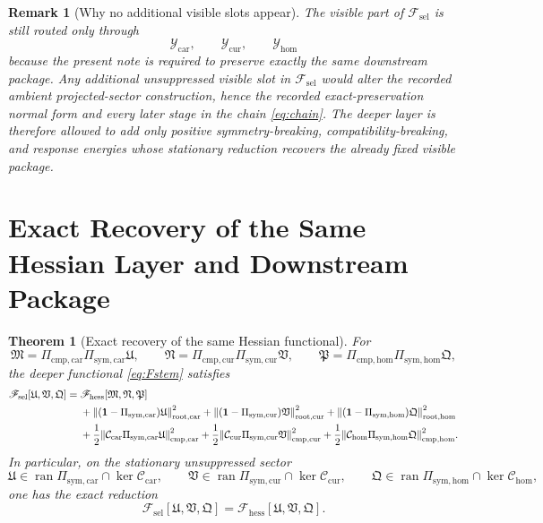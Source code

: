 \documentclass[11pt]{article}
\newcommand{\RootFunctional}{\mathscr F_{\mathrm{hess}}}
\newcommand{\StemFunctional}{\mathscr F_{\mathrm{sel}}}
\newcommand{\ProtoTensorClass}{\mathscr Y_{\mathrm{car}}}
\newcommand{\ProtoRelabelClass}{\mathscr Y_{\mathrm{cur}}}
\newcommand{\ProtoFreeClass}{\mathscr Y_{\mathrm{hom}}}
\newcommand{\UltraTensor}{\mathfrak M}
\newcommand{\UltraRelabel}{\mathfrak N}
\newcommand{\UltraFree}{\mathfrak P}
\newcommand{\RootTensor}{\mathfrak U}
\newcommand{\RootRelabel}{\mathfrak V}
\newcommand{\RootFree}{\mathfrak Q}
\newcommand{\TensorSymProj}{\Pi_{\mathrm{sym,car}}}
\newcommand{\CurSymProj}{\Pi_{\mathrm{sym,cur}}}
\newcommand{\HomSymProj}{\Pi_{\mathrm{sym,hom}}}
\newcommand{\TensorCompat}{\mathcal C_{\mathrm{car}}}
\newcommand{\CurCompat}{\mathcal C_{\mathrm{cur}}}
\newcommand{\HomCompat}{\mathcal C_{\mathrm{hom}}}
\newcommand{\TensorCmpProj}{\Pi_{\mathrm{cmp,car}}}
\newcommand{\CurCmpProj}{\Pi_{\mathrm{cmp,cur}}}
\newcommand{\HomCmpProj}{\Pi_{\mathrm{cmp,hom}}}
\newtheorem{remark}{Remark}
\newtheorem{theorem}{Theorem}
\begin{document}
\begin{remark}[Why no additional visible slots appear]
\label{rem:no_new_slots}
The visible part of \(\StemFunctional\) is still routed only through
\[
\ProtoTensorClass,\qquad
\ProtoRelabelClass,\qquad
\ProtoFreeClass
\]
because the present note is required to preserve exactly the same downstream package. Any additional unsuppressed visible slot in \(\StemFunctional\) would alter the recorded ambient projected-sector construction, hence the recorded exact-preservation normal form and every later stage in the chain \eqref{eq:chain}. The deeper layer is therefore allowed to add only positive symmetry-breaking, compatibility-breaking, and response energies whose stationary reduction recovers the already fixed visible package.
\end{remark}

\section{Exact Recovery of the Same Hessian Layer and Downstream Package}

\begin{theorem}[Exact recovery of the same Hessian functional]
\label{thm:recover_root}
For
\begin{equation}
\UltraTensor=\TensorCmpProj\TensorSymProj\RootTensor,
\qquad
\UltraRelabel=\CurCmpProj\CurSymProj\RootRelabel,
\qquad
\UltraFree=\HomCmpProj\HomSymProj\RootFree,
\label{eq:ultra_from_root}
\end{equation}
the deeper functional \eqref{eq:Fstem} satisfies
\begin{equation}
\begin{aligned}
\StemFunctional[\RootTensor,\RootRelabel,\RootFree]
=\;
&\RootFunctional[\UltraTensor,\UltraRelabel,\UltraFree]
\\
&+\norm{(\mathbf 1-\TensorSymProj)\RootTensor}_{\mathrm{root,car}}^2
+\norm{(\mathbf 1-\CurSymProj)\RootRelabel}_{\mathrm{root,cur}}^2
+\norm{(\mathbf 1-\HomSymProj)\RootFree}_{\mathrm{root,hom}}^2
\\
&+\frac12\norm{\TensorCompat\TensorSymProj\RootTensor}_{\mathrm{cmp,car}}^2
+\frac12\norm{\CurCompat\CurSymProj\RootRelabel}_{\mathrm{cmp,cur}}^2
+\frac12\norm{\HomCompat\HomSymProj\RootFree}_{\mathrm{cmp,hom}}^2.
\end{aligned}
\label{eq:Fstem_decomposed}
\end{equation}
In particular, on the stationary unsuppressed sector
\[
\RootTensor\in\operatorname{ran}\TensorSymProj\cap\ker\TensorCompat,\qquad
\RootRelabel\in\operatorname{ran}\CurSymProj\cap\ker\CurCompat,\qquad
\RootFree\in\operatorname{ran}\HomSymProj\cap\ker\HomCompat,
\]
one has the exact reduction
\begin{equation}
\StemFunctional[\RootTensor,\RootRelabel,\RootFree]
=
\RootFunctional[\RootTensor,\RootRelabel,\RootFree].
\label{eq:Fstem_equals_Froot}
\end{equation}
\end{theorem}
\end{document}
